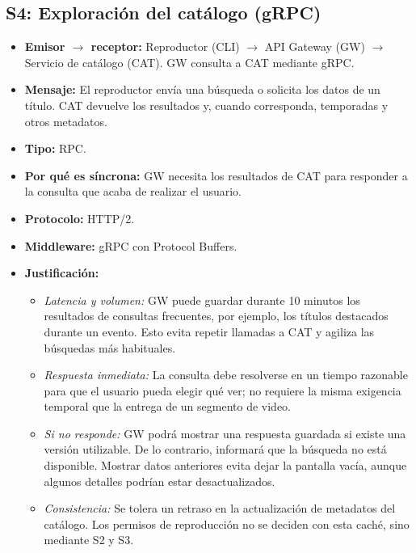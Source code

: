 \subsection{S4: Exploración del catálogo (gRPC)}
\label{sub:s4}

\begin{itemize}
    \item \textbf{Emisor $\rightarrow$ receptor:}
    Reproductor (CLI) $\rightarrow$ API Gateway (GW) $\rightarrow$ Servicio de catálogo (CAT). GW consulta a CAT mediante gRPC.

    \item \textbf{Mensaje:}
    El reproductor envía una búsqueda o solicita los datos de un título. CAT devuelve los resultados y, cuando corresponda, temporadas y otros metadatos.

    \item \textbf{Tipo:} RPC.

    \item \textbf{Por qué es síncrona:}
    GW necesita los resultados de CAT para responder a la consulta que acaba de realizar el usuario.

    \item \textbf{Protocolo:} HTTP/2.

    \item \textbf{Middleware:} gRPC con Protocol Buffers.

    \item \textbf{Justificación:}
    \begin{itemize}
        \item \textit{Latencia y volumen:}
        GW puede guardar durante 10 minutos los resultados de consultas frecuentes, por ejemplo, los títulos destacados durante un evento. Esto evita repetir llamadas a CAT y agiliza las búsquedas más habituales.

        \item \textit{Respuesta inmediata:}
        La consulta debe resolverse en un tiempo razonable para que el usuario pueda elegir qué ver; no requiere la misma exigencia temporal que la entrega de un segmento de video.

        \item \textit{Si no responde:}
        GW podrá mostrar una respuesta guardada si existe una versión utilizable. De lo contrario, informará que la búsqueda no está disponible. Mostrar datos anteriores evita dejar la pantalla vacía, aunque algunos detalles podrían estar desactualizados.

        \item \textit{Consistencia:}
        Se tolera un retraso en la actualización de metadatos del catálogo. Los permisos de reproducción no se deciden con esta caché, sino mediante S2 y S3.
    \end{itemize}

\end{itemize}

